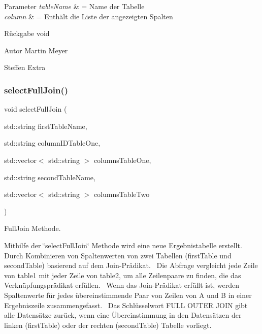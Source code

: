 \begin{DoxyParams}{Parameter}
{\em table\+Name} & = Name der Tabelle \\
\hline
{\em column} & = Enthält die Liste der angezeigten Spalten\\
\hline
\end{DoxyParams}
\begin{DoxyReturn}{Rückgabe}
void
\end{DoxyReturn}
\begin{DoxyAuthor}{Autor}
Martin Meyer 

Steffen Extra 
\end{DoxyAuthor}
\mbox{\label{selection_request_8hpp_a41392b97718c999af4867dc0c62ade0c}} 
\subsubsection{select\+Full\+Join()}
{\footnotesize\ttfamily void select\+Full\+Join (\begin{DoxyParamCaption}\item[{std\+::string}]{first\+Table\+Name,  }\item[{std\+::string}]{column\+I\+D\+Table\+One,  }\item[{std\+::vector$<$ std\+::string $>$}]{columns\+Table\+One,  }\item[{std\+::string}]{second\+Table\+Name,  }\item[{std\+::vector$<$ std\+::string $>$}]{columns\+Table\+Two }\end{DoxyParamCaption})}



Full\+Join Methode. 

Mithilfe der \char`\"{}select\+Full\+Join\char`\"{} Methode wird eine neue Ergebnistabelle erstellt.~\newline
 Durch Kombinieren von Spaltenwerten von zwei Tabellen (first\+Table und second\+Table) basierend auf dem Join-\/\+Prädikat.~\newline
 Die Abfrage vergleicht jede Zeile von table1 mit jeder Zeile von table2, um alle Zeilenpaare zu finden, die das Verknüpfungsprädikat erfüllen.~\newline
 Wenn das Join-\/\+Prädikat erfüllt ist, werden Spaltenwerte für jedes übereinstimmende Paar von Zeilen von A und B in einer Ergebniszeile zusammengefasst.~\newline
 Das Schlüsselwort F\+U\+LL O\+U\+T\+ER J\+O\+IN gibt alle Datensätze zurück, wenn eine Übereinstimmung in den Datensätzen der linken (first\+Table) oder der rechten (second\+Table) Tabelle vorliegt.~\newline


